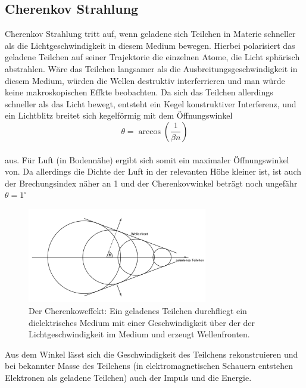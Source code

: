 \subsection{Cherenkov Strahlung}
Cherenkov Strahlung tritt auf, wenn geladene sich Teilchen in Materie schneller als die Lichtgeschwindigkeit in diesem Medium bewegen. Hierbei polarisiert das geladene Teilchen auf seiner Trajektorie die einzelnen Atome, die Licht sphärisch abstrahlen. Wäre das Teilchen langsamer als die Ausbreitungsgeschwindigkeit in diesem Medium, würden die Wellen destruktiv interferrieren und man würde keine makroskopischen Effkte beobachten. Da sich das Teilchen allerdings schneller als das Licht bewegt, entsteht ein Kegel konstruktiver Interferenz, und ein Lichtblitz breitet sich kegelförmig mit dem Öffnungswinkel
\begin{equation}
\theta = \arccos\left(\frac{1}{\beta n}\right) \label{eq:cherenkow}
\end{equation}\\
aus. Für Luft (in Bodennähe) ergibt sich somit ein maximaler Öffnungswinkel von. Da allerdings die Dichte der Luft in der relevanten Höhe kleiner ist, ist auch der Brechungsindex näher an 1 und der Cherenkovwinkel beträgt noch ungefähr $\theta = 1^{\circ}$\cite{Grupen}
\begin{figure}[htbp]
\centering
\includegraphics[width=0.7\textwidth]{Images/cherenkow.png}
\caption{Der Cherenkoweffekt: Ein geladenes Teilchen durchfliegt ein dielektrisches Medium mit einer Geschwindigkeit über der der Lichtgeschwindigkeit im Medium und erzeugt Wellenfronten.}
\label{img:cherenkow}
\end{figure}
Aus dem Winkel lässt sich die Geschwindigkeit des Teilchens rekonstruieren und bei bekannter Masse des Teilchens (in elektromagnetischen Schauern entstehen Elektronen als geladene Teilchen) auch der Impuls und die Energie.

